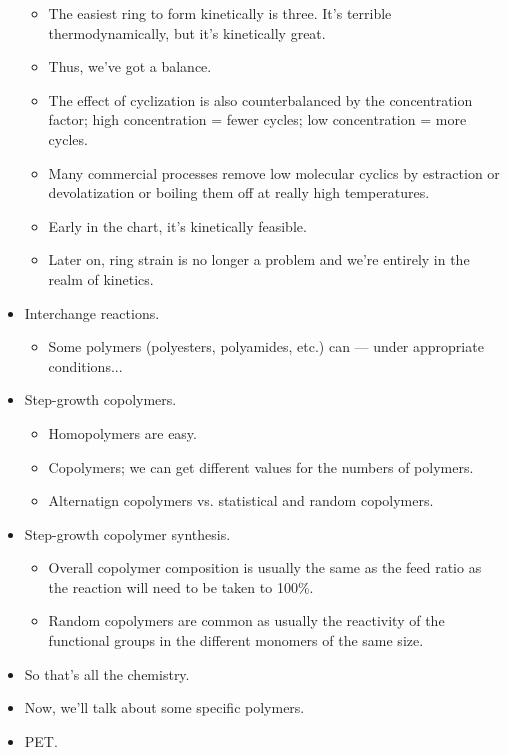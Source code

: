 \documentclass[../notes.tex]{subfiles}
\begin{document}
\begin{itemize}
\begin{itemize}
        \item The easiest ring to form kinetically is three. It's terrible thermodynamically, but it's kinetically great.
        \item Thus, we've got a balance.
        \item The effect of cyclization is also counterbalanced by the concentration factor; high concentration = fewer cycles; low concentration = more cycles.
        \item Many commercial processes remove low molecular cyclics by estraction or devolatization or boiling them off at really high temperatures.
        \item Early in the chart, it's kinetically feasible.
        \item Later on, ring strain is no longer a problem and we're entirely in the realm of kinetics.
    \end{itemize}
    \item Interchange reactions.
    \begin{itemize}
        \item Some polymers (polyesters, polyamides, etc.) can --- under appropriate conditions...
    \end{itemize}
    \item Step-growth copolymers.
    \begin{itemize}
        \item Homopolymers are easy.
        \item Copolymers; we can get different values for the numbers of polymers.
        \item Alternatign copolymers vs. statistical and random copolymers.
    \end{itemize}
    \item Step-growth copolymer synthesis.
    \begin{itemize}
        \item Overall copolymer composition is usually the same as the feed ratio as the reaction will need to be taken to 100\%.
        \item Random copolymers are common as usually the reactivity of the functional groups in the different monomers of the same size.
    \end{itemize}
    \item So that's all the chemistry.
    \item Now, we'll talk about some specific polymers.
    \item PET.
    \begin{itemize}

\end{itemize}
\end{itemize}
\end{document}
